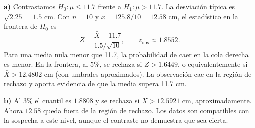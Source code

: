 \textbf{a)} Contrastamos $H_0:\mu\le11.7$ frente a $H_1:\mu>11.7$.
La desviación típica es $\sqrt{2.25}=1.5$ cm. Con $n=10$ y
$\bar x=125.8/10=12.58$ cm, el estadístico en la frontera de $H_0$ es
\[
Z=\frac{\bar X-11.7}{1.5/\sqrt{10}},\qquad z_{\mathrm{obs}}\approx1.8552.
\]
Para una media nula menor que 11.7, la probabilidad de caer en
la cola derecha es menor. En la frontera, al $5\%$, se rechaza
si $Z>1.6449$, o equivalentemente si $\bar X>12.4802$ cm
(con umbrales aproximados). La observación cae en la región
de rechazo y aporta evidencia de que la media supera 11.7 cm.

\textbf{b)} Al $3\%$ el cuantil es $1.8808$ y se rechaza si
$\bar X>12.5921$ cm, aproximadamente. Ahora $12.58$ queda fuera
de la región de rechazo. Los datos son compatibles con la
sospecha a este nivel, aunque el contraste no demuestra que sea cierta.
